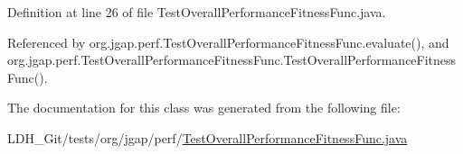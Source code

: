 Definition at line 26 of file Test\-Overall\-Performance\-Fitness\-Func.\-java.



Referenced by org.\-jgap.\-perf.\-Test\-Overall\-Performance\-Fitness\-Func.\-evaluate(), and org.\-jgap.\-perf.\-Test\-Overall\-Performance\-Fitness\-Func.\-Test\-Overall\-Performance\-Fitness\-Func().



The documentation for this class was generated from the following file\-:\begin{DoxyCompactItemize}
\item 
L\-D\-H\-\_\-\-Git/tests/org/jgap/perf/\hyperlink{_test_overall_performance_fitness_func_8java}{Test\-Overall\-Performance\-Fitness\-Func.\-java}\end{DoxyCompactItemize}
